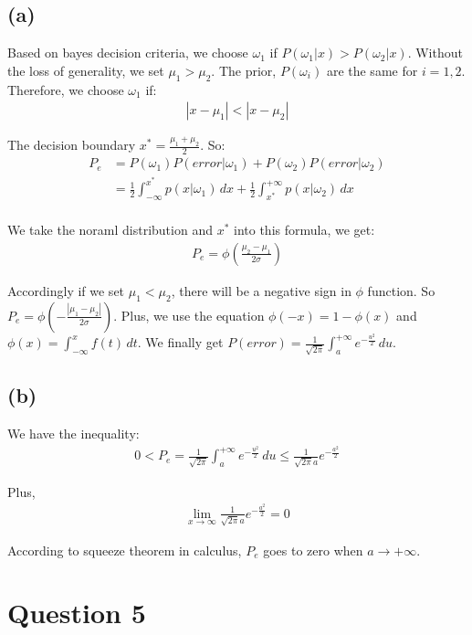 \documentclass{article}
\newcommand{\question}[1]{\section*{Question #1}}
\renewcommand{\part}[1]{\subsection*{(#1)}}
\begin{document}
\part{a}
Based on bayes decision criteria, we choose $\omega_1$ if $P(\omega_1|x) > P(\omega_2|x)$. Without the loss of generality, we set $\mu_1 > \mu_2$. The prior, $P(\omega_i)$ are the same for $i = 1, 2$. Therefore, we choose $\omega_1$ if:
\begin{align*}
  |x - \mu_1| < |x - \mu_2|
\end{align*} \par
The decision boundary $x^* = \frac{\mu_1 + \mu_2}{2}$. So:
\begin{align*}
  P_e &= P(\omega_1)P(error | \omega_1) + P(\omega_2)P(error | \omega_2) \\
      &= \frac{1}{2}\int^{x^*}_{-\infty}p(x | \omega_1) \, dx + \frac{1}{2}\int^{+\infty}_{x^*}p(x | \omega_2) \, dx\\
\end{align*} \par
We take the noraml distribution and $x^*$ into this formula, we get:
\begin{align}
  P_e = \phi(\frac{\mu_2 - \mu_1}{2 \sigma})
\end{align} \par
Accordingly if we set $\mu_1 < \mu_2$, there will be a negative sign in $\phi$ function. So $P_e = \phi(-\frac{|\mu_1 - \mu_2|}{2 \sigma})$. Plus, we use the equation $\phi(-x) = 1 - \phi(x)$ and $\phi(x) = \int^x_{-\infty} f(t) \, dt$. We finally get $P(error) = \frac{1}{\sqrt{2\pi}}\int^{+\infty}_a e^{-\frac{u^2}{2}} \, du$.
\part{b} \par
We have the inequality:
\begin{align*}
  0 < P_e = \frac{1}{\sqrt{2\pi}}\int^{+\infty}_a e^{-\frac{u^2}{2}} \, du\leq\frac{1}{\sqrt{2\pi}a}e^{-\frac{a^2}{2}}
\end{align*} \par
Plus,
\begin{align*}
  \lim_{x \rightarrow \infty}\frac{1}{\sqrt{2\pi}a}e^{-\frac{a^2}{2}} = 0
\end{align*} \par
According to squeeze theorem in calculus, $P_e$ goes to zero when $a \rightarrow +\infty$.

\question{5}
\end{document}

